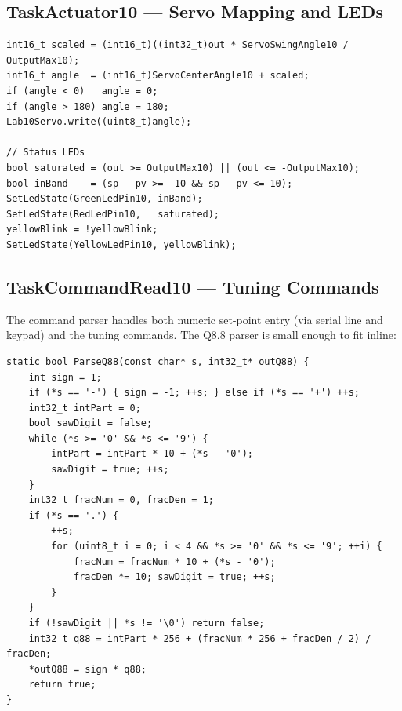 \documentclass[12pt]{article}
\begin{document}
\subsection{TaskActuator10 --- Servo Mapping and LEDs}

\begin{lstlisting}[caption={TaskActuator10 --- output $\to$ servo angle, LEDs}]
int16_t scaled = (int16_t)((int32_t)out * ServoSwingAngle10 / OutputMax10);
int16_t angle  = (int16_t)ServoCenterAngle10 + scaled;
if (angle < 0)   angle = 0;
if (angle > 180) angle = 180;
Lab10Servo.write((uint8_t)angle);

// Status LEDs
bool saturated = (out >= OutputMax10) || (out <= -OutputMax10);
bool inBand    = (sp - pv >= -10 && sp - pv <= 10);
SetLedState(GreenLedPin10, inBand);
SetLedState(RedLedPin10,   saturated);
yellowBlink = !yellowBlink;
SetLedState(YellowLedPin10, yellowBlink);
\end{lstlisting}

\subsection{TaskCommandRead10 --- Tuning Commands}

The command parser handles both numeric set-point entry (via serial line and keypad) and the tuning commands. The Q8.8 parser is small enough to fit inline:

\begin{lstlisting}[caption={ParseQ88 --- decimal string $\to$ Q8.8 fixed-point}]
static bool ParseQ88(const char* s, int32_t* outQ88) {
    int sign = 1;
    if (*s == '-') { sign = -1; ++s; } else if (*s == '+') ++s;
    int32_t intPart = 0;
    bool sawDigit = false;
    while (*s >= '0' && *s <= '9') {
        intPart = intPart * 10 + (*s - '0');
        sawDigit = true; ++s;
    }
    int32_t fracNum = 0, fracDen = 1;
    if (*s == '.') {
        ++s;
        for (uint8_t i = 0; i < 4 && *s >= '0' && *s <= '9'; ++i) {
            fracNum = fracNum * 10 + (*s - '0');
            fracDen *= 10; sawDigit = true; ++s;
        }
    }
    if (!sawDigit || *s != '\0') return false;
    int32_t q88 = intPart * 256 + (fracNum * 256 + fracDen / 2) / fracDen;
    *outQ88 = sign * q88;
    return true;
}
\end{lstlisting}
\end{document}
